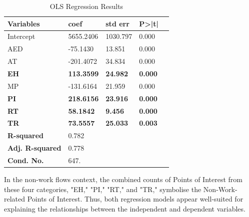         \begin{table}[H]
        \centering
        \begin{tabular}{@{}lllll@{}}
        \toprule
        \textbf{Variables} & \textbf{coef} & \textbf{std err} & \textbf{P>|t|} \\ \midrule
        Intercept & 5655.2406 & 1030.797 & 0.000 \\
        AED & -75.1430 & 13.851 & 0.000 \\
        AT & -201.4072 & 34.834 & 0.000 \\
        \textcolor{customblue}{\textbf{EH}} & \textcolor{customblue}{\textbf{113.3599}} & \textcolor{customblue}{\textbf{24.982}} & \textcolor{customblue}{\textbf{0.000}} \\
        MP & -131.6164 & 21.959 & 0.000 \\
        \textcolor{customblue}{\textbf{PI}} & \textcolor{customblue}{\textbf{218.6156}} & \textcolor{customblue}{\textbf{23.916}} & \textcolor{customblue}{\textbf{0.000}} \\
        \textcolor{customblue}{\textbf{RT}} & \textcolor{customblue}{\textbf{58.1842}} & \textcolor{customblue}{\textbf{9.456}} & \textcolor{customblue}{\textbf{0.000}} \\
        \textcolor{customblue}{\textbf{TR}} & \textcolor{customblue}{\textbf{73.5557}} & \textcolor{customblue}{\textbf{25.033}} & \textcolor{customblue}{\textbf{0.003}} \\ \bottomrule
        \textbf{R-squared} & 0.782 \\
        \textbf{Adj. R-squared} & 0.778 \\
        \textbf{Cond. No.} & 647. \\ \bottomrule
        \hline
        \end{tabular}
        \caption{OLS Regression Results}
        \label{tab:ols-results-new-bold-color}
        \end{table}

        In the non-work flows context, the combined counts of Points of Interest from these four categories, "EH," "PI," "RT," and "TR," symbolise the Non-Work-related Points of Interest. Thus, both regression models appear well-suited for explaining the relationships between the independent and dependent variables.


